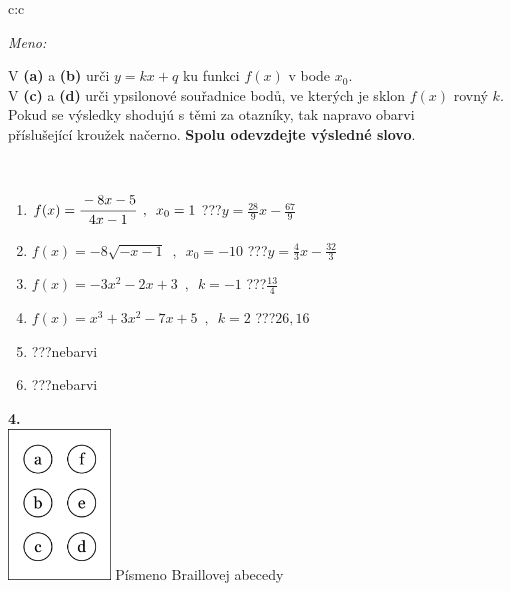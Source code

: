 \documentclass[10pt]{report}
\begin{document}
\begin{tabular}{c:c}
\begin{minipage}[c][104.5mm][t]{0.5\linewidth}
\begin{center}
\textit{Meno:}\phantom{xxxxxxxxxxxxxxxxxxxxxxxxxxxxxxxxxxxxxxxxxxxxxxxxxxxxxxxxxxxxxxxxx}\\[5mm]
\begin{minipage}{0.95\linewidth}
\begin{center}
V \textbf{(a)} a \textbf{(b)} urči  $y = kx + q$ ku funkci $f(x)$ v bode $x_0$.\\V \textbf{(c)} a \textbf{(d)} urči ypsilonové souřadnice bodů, ve kterých je sklon $f(x)$ rovný $k$.\\Pokud se výsledky shodujú s těmi za otazníky, tak napravo obarvi\\příslušející kroužek načerno. \textbf{Spolu odevzdejte výsledné slovo}.
\end{center}
\end{minipage}
\\[1mm]
\begin{minipage}{0.79\linewidth}
\begin{center}
\begin{varwidth}{\linewidth}
\begin{enumerate}
\small
\item $f(x)=\cfrac{-8x-5}{4x-1}\enspace , \enspace x_0=1$\quad \dotfill\; ???\;\dotfill \quad $y = \frac{28}{9}x-\frac{67}{9}$
\item $f(x)=-8\sqrt{-x-1}\enspace , \enspace x_0=-10$\quad \dotfill\; ???\;\dotfill \quad $y = \frac{4}{3}x-\frac{32}{3}$
\item $f(x)=-3x^2-2x+3\enspace , \enspace k=-1$\quad \dotfill\; ???\;\dotfill \quad $\frac{13}{4}$
\item $f(x)=x^3+3x^2-7x+5\enspace , \enspace k=2$\quad \dotfill\; ???\;\dotfill \quad $26 , 16$
\item \quad \dotfill\; ???\;\dotfill \quad nebarvi
\item \quad \dotfill\; ???\;\dotfill \quad nebarvi
\end{enumerate}
\end{varwidth}
\end{center}
\end{minipage}
\begin{minipage}{0.20\linewidth}
\begin{center}
{\Huge\bfseries 4.} \\[2mm]
\includegraphics[height=40mm]{../images/braille.png}
{\small Písmeno Braillovej abecedy}
\end{center}
\end{minipage}
\end{center}
\end{minipage}
%
\end{tabular}
\end{document}
